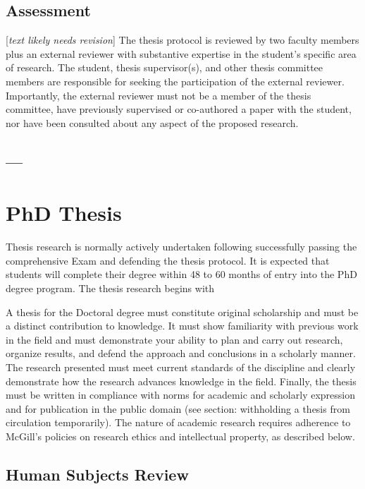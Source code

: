 \documentclass[
]{book}
\begin{document}
\hypertarget{assessment}{%
\section{Assessment}\label{assessment}}

{[}\emph{text likely needs revision}{]}
The thesis protocol is reviewed by two faculty members plus an external reviewer with substantive expertise in the student's specific area of research. The student, thesis supervisor(s), and other thesis committee members are responsible for seeking the participation of the external reviewer. Importantly, the external reviewer must not be a member of the thesis committee, have previously supervised or co-authored a paper with the student, nor have been consulted about any aspect of the proposed research.

\hypertarget{section-5}{%
\section{---}\label{section-5}}

\hypertarget{phd-thesis}{%
\chapter{PhD Thesis}\label{phd-thesis}}

Thesis research is normally actively undertaken following successfully passing the comprehensive Exam and defending the thesis protocol. It is expected that students will complete their degree within 48 to 60 months of entry into the PhD degree program. The thesis research begins with

A thesis for the Doctoral degree must constitute original scholarship and must be a distinct contribution to knowledge. It must show familiarity with previous work in the field and must demonstrate your ability to plan and carry out research, organize results, and defend the approach and conclusions in a scholarly manner. The research presented must meet current standards of the discipline and clearly demonstrate how the research advances knowledge in the field. Finally, the thesis must be written in compliance with norms for academic and scholarly expression and for publication in the public domain (see section: withholding a thesis from circulation temporarily). The nature of academic research requires adherence to McGill's policies on research ethics and intellectual property, as described below.

\hypertarget{human-subjects-review}{%
\section{Human Subjects Review}\label{human-subjects-review}}
\end{document}
